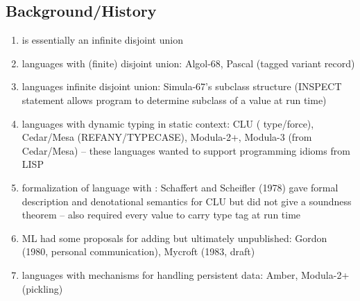 \documentclass[12pt]{article}	%
\begin{document}
\subsection*{Background/History}
\begin{enumerate}
	\item \Dynamic is essentially an infinite disjoint union
	\item languages with (finite) disjoint union: Algol-68, Pascal (tagged variant record)
	\item languages infinite disjoint union: Simula-67's subclass structure (INSPECT statement allows program to determine subclass of a value at run time)
	\item languages with dynamic typing in static context: CLU ( type/force), Cedar/Mesa (REFANY/TYPECASE), Modula-2+, Modula-3 (from Cedar/Mesa) -- these languages wanted to support programming idioms from LISP
	\item formalization of language with \Dynamic: Schaffert and Scheifler (1978) gave formal description and denotational semantics for CLU but did not give a soundness theorem -- also required every value to carry type tag at run time
	\item ML had some proposals for adding \Dynamic but ultimately unpublished: Gordon (1980, personal communication), Mycroft (1983, draft)
	\item languages with mechanisms for handling persistent data: Amber, Modula-2+ (pickling)
\end{enumerate}
\end{document}
